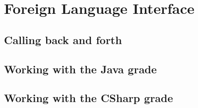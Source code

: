 \chapter{Foreign Language Interface}

\section{Calling back and forth}

\section{Working with the Java grade}


\section{Working with the CSharp grade}



